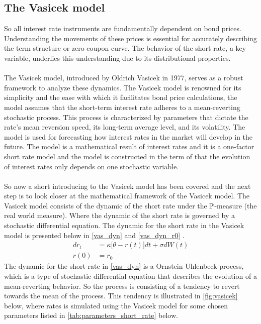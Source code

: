 \subsection{The Vasicek model}
So all interest rate instruments are fundamentally dependent on bond prices. Understanding the movements of 
these prices is essential for accurately describing the term structure or zero coupon curve. The behavior 
of the short rate, a key variable, underlies this understanding due to its distributional properties.
\\\\
The Vasicek model, introduced by Oldrich Vasicek in 1977, serves as a robust framework to analyze these dynamics.
The Vasicek model is renowned for its simplicity and the ease with which it facilitates bond price calculations, 
the model assumes that the short-term interest rate adheres to a mean-reverting stochastic process. This process is characterized 
by parameters that dictate the rate's mean reversion speed, its long-term average level, and its volatility.
The model is used for forecasting how interest rates in the market will develop in the future. The model is a
mathematical result of interest rates and it is a one-factor short rate model and the model is constructed in the 
term of that the evolution of interest rates only depends on one stochastic variable.
\\\\
So now a short introducing to the Vasicek model has been covered and the next step is to look closer at the 
mathematical framework of the Vasicek model. The Vasicek model consists of the dynamic of the short rate under the $\mathbb{P}$-measure
(the real world measure). Where the dynamic of the short rate is governed by a stochastic differential equation. 
The dynamic for the short rate in the Vasicek model is presented below in \autoref{vas_dyn} and \autoref{vas_dyn_r0} \cite{Bjork}.
\begin{align}
    d r_t &= \kappa \Big[\theta -r(t)\Big] dt + \sigma d W(t) \label{vas_dyn}\\
    r(0) &= r_0 \label{vas_dyn_r0}
\end{align}
The dynamic for the short rate in \autoref{vas_dyn} is a Ornstein-Uhlenbeck process, which is a type of stochastic 
differential equation that describes the evolution of a mean-reverting behavior. So the process is consisting of a 
tendency to revert towards the mean of the process. This tendency is illustrated in \autoref{fig:vasicek} below, where 
 rates is simulated using the Vasicek model for some chosen parameters listed in \autoref{tab:parameters_short_rate} below. 
